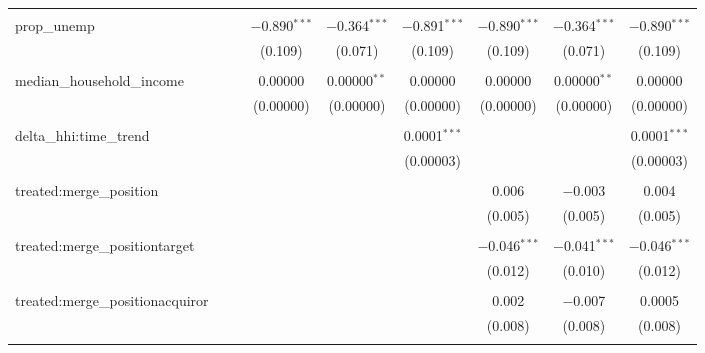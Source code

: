 \begin{table}[H]
{\begin{tabular}{@{\extracolsep{5pt}}lcccccccc}
   & & & & & & & & \\  

  prop\_unemp &  &  & $-$0.890$^{***}$ & $-$0.364$^{***}$ & $-$0.891$^{***}$ & $-$0.890$^{***}$ & $-$0.364$^{***}$ & $-$0.890$^{***}$ \\  

   &  &  & (0.109) & (0.071) & (0.109) & (0.109) & (0.071) & (0.109) \\  

   & & & & & & & & \\  

  median\_household\_income &  &  & 0.00000 & 0.00000$^{**}$ & 0.00000 & 0.00000 & 0.00000$^{**}$ & 0.00000 \\  

   &  &  & (0.00000) & (0.00000) & (0.00000) & (0.00000) & (0.00000) & (0.00000) \\  

   & & & & & & & & \\  

  delta\_hhi:time\_trend &  &  &  &  & 0.0001$^{***}$ &  &  & 0.0001$^{***}$ \\  

   &  &  &  &  & (0.00003) &  &  & (0.00003) \\  

   & & & & & & & & \\  

  treated:merge\_position &  &  &  &  &  & 0.006 & $-$0.003 & 0.004 \\  

   &  &  &  &  &  & (0.005) & (0.005) & (0.005) \\  

   & & & & & & & & \\  

  treated:merge\_positiontarget &  &  &  &  &  & $-$0.046$^{***}$ & $-$0.041$^{***}$ & $-$0.046$^{***}$ \\  

   &  &  &  &  &  & (0.012) & (0.010) & (0.012) \\  

   & & & & & & & & \\  

  treated:merge\_positionacquiror &  &  &  &  &  & 0.002 & $-$0.007 & 0.0005 \\  

   &  &  &  &  &  & (0.008) & (0.008) & (0.008) \\  

   & & & & & & & & \\  


\end{tabular}}
\end{table}
